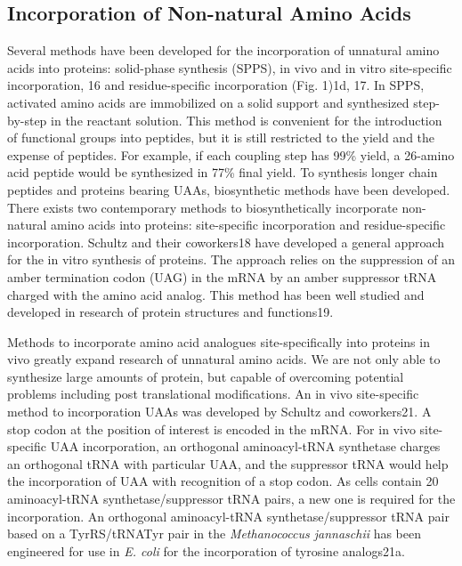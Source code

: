 \begin{refsection}
\subsection{Incorporation of Non-natural Amino Acids}
\label{sec:rsi}

Several methods have been developed for the incorporation of unnatural amino
acids into proteins: solid-phase synthesis (SPPS)\cite{Mahto2011}, in vivo and
in vitro site-specific incorporation, 16 and residue-specific incorporation
(Fig. 1)1d, 17. In SPPS, activated amino acids are immobilized on a solid
support and synthesized step-by-step in the reactant solution. This method is
convenient for the introduction of functional groups into peptides, but it is
still restricted to the yield and the expense of peptides. For example, if each
coupling step has 99\% yield, a 26-amino acid peptide would be synthesized in
77\% final yield. To synthesis longer chain peptides and proteins bearing UAAs,
biosynthetic methods have been developed.  There exists two contemporary
methods to biosynthetically incorporate non-natural amino acids into proteins:
site-specific incorporation and residue-specific incorporation. Schultz and
their coworkers18 have developed a general approach for the in vitro synthesis
of proteins. The approach relies on the suppression of an amber termination
codon (UAG) in the mRNA by an amber suppressor tRNA charged with the amino acid
analog. This method has been well studied and developed in research of protein
structures and functions19. 

Methods to incorporate amino acid analogues site-specifically into proteins in
vivo greatly expand research of unnatural amino acids. We are not only able to
synthesize large amounts of protein, but capable of overcoming potential
problems including post translational modifications. An in vivo site-specific
method to incorporation UAAs was developed by Schultz and coworkers21. A stop
codon at the position of interest is encoded in the mRNA. For in vivo
site-specific UAA incorporation, an orthogonal aminoacyl-tRNA synthetase
charges an orthogonal tRNA with particular UAA, and the suppressor tRNA would
help the incorporation of UAA with recognition of a stop codon. As cells
contain 20 aminoacyl-tRNA synthetase/suppressor tRNA pairs, a new one is
required for the incorporation. An orthogonal aminoacyl-tRNA
synthetase/suppressor tRNA pair based on a TyrRS/tRNATyr pair in the
\emph{Methanococcus jannaschii} has been engineered for use in \emph{E. coli}
for the incorporation of tyrosine analogs21a.


\end{refsection}

